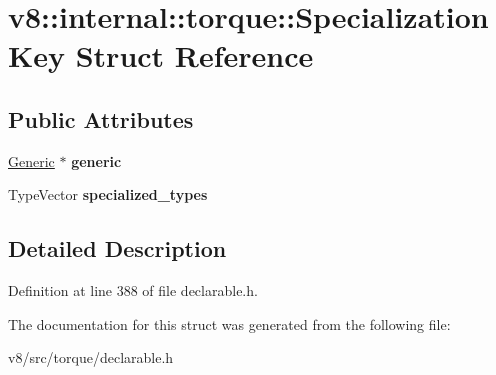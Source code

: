 \hypertarget{structv8_1_1internal_1_1torque_1_1SpecializationKey}{}\section{v8\+:\+:internal\+:\+:torque\+:\+:Specialization\+Key Struct Reference}
\label{structv8_1_1internal_1_1torque_1_1SpecializationKey}
\subsection*{Public Attributes}
\begin{DoxyCompactItemize}
\item 
\mbox{\label{structv8_1_1internal_1_1torque_1_1SpecializationKey_ad03dfdfdaf6cff8003cb1573729060c9}} 
\mbox{\hyperlink{classv8_1_1internal_1_1torque_1_1Generic}{Generic}} $\ast$ {\bfseries generic}
\item 
\mbox{\label{structv8_1_1internal_1_1torque_1_1SpecializationKey_a6025c33a4506fff1f350832a380f53df}} 
Type\+Vector {\bfseries specialized\+\_\+types}
\end{DoxyCompactItemize}


\subsection{Detailed Description}


Definition at line 388 of file declarable.\+h.



The documentation for this struct was generated from the following file\+:\begin{DoxyCompactItemize}
\item 
v8/src/torque/declarable.\+h\end{DoxyCompactItemize}
